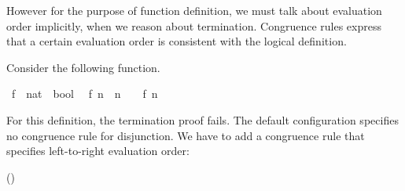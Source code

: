 \begin{isabellebody}
\begin{isamarkuptext}
  However for the purpose of function definition, we must talk about
  evaluation order implicitly, when we reason about termination.
  Congruence rules express that a certain evaluation order is
  consistent with the logical definition. 

  Consider the following function.%
\end{isamarkuptext}%
\isamarkuptrue%
\isamarkupfalse%
\ f\ {}{}\ {}nat\ {}\ bool{}\isanewline
{}\isanewline
\ \ {}f\ n\ {}\ {}n\ {}\ {}\ {}\ f\ {}n\ {}\ {}{}{}{}%
\isadelimproof
%
\endisadelimproof
%
\isatagproof
%
\endisatagproof
{\isafoldproof}%
%
\isadelimproof
%
\endisadelimproof
%
\begin{isamarkuptext}%
For this definition, the termination proof fails. The default configuration
  specifies no congruence rule for disjunction. We have to add a
  congruence rule that specifies left-to-right evaluation order:

  \vspace{1ex}
  \noindent {}\hfill()
  \vspace{1ex}


\end{isamarkuptext}
\end{isabellebody}
